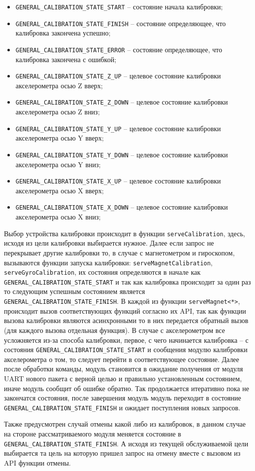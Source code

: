 \begin{itemize}
    \item \lstinline{GENERAL_CALIBRATION_STATE_START} -- состояние начала калибровки;
     \item \lstinline{GENERAL_CALIBRATION_STATE_FINISH} -- состояние определяющее, что калибровка закончена успешно;
     \item \lstinline{GENERAL_CALIBRATION_STATE_ERROR} -- состояние определяющее, что калибровка закончена с ошибкой;
     \item \lstinline{GENERAL_CALIBRATION_STATE_Z_UP} -- целевое состояние калибровки акселерометра осью Z вверх;
     \item \lstinline{GENERAL_CALIBRATION_STATE_Z_DOWN} -- целевое состояние калибровки акселерометра осью Z вниз; 
     \item \lstinline{GENERAL_CALIBRATION_STATE_Y_UP} -- целевое состояние калибровки акселерометра осью Y вверх; 
     \item \lstinline{GENERAL_CALIBRATION_STATE_Y_DOWN} -- целевое состояние калибровки акселерометра осью Y вниз; 
     \item \lstinline{GENERAL_CALIBRATION_STATE_X_UP} -- целевое состояние калибровки акселерометра осью X вверх; 
     \item \lstinline{GENERAL_CALIBRATION_STATE_X_DOWN} -- целевое состояние калибровки акселерометра осью X вниз; 
\end{itemize}

Выбор устройства калибровки происходит в функции \lstinline{serveCalibration}, здесь, исходя из цели калибровки выбирается нужное. Далее если запрос не
перекрывает другие калибровки то, в случае с магнетометром и гироскопом, вызываются функции запуска калибровки: \lstinline{serveMagnetCalibration},
\lstinline{serveGyroCalibration}, их состояния определяются в начале как \lstinline{GENERAL_CALIBRATION_STATE_START} и так как калибровка происходит за один раз
то следующим успешным состоянием является \lstinline{GENERAL_CALIBRATION_STATE_FINISH}. В каждой из функции \lstinline{serveMagnet<*>}, происходит вызов соответствующих
функций согласно их API, так как функции вызова калибровки являются асинхронными то в них передается обратный вызов (для каждого вызова отдельная функция).
В случае с акселерометром все усложняется из-за способа калибровки, первое, с чего начинается калибровка -- с состояния \lstinline{GENERAL_CALIBRATION_STATE_START} и
сообщения модулю калибровки акселерометра о том, то следует перейти в соответствующее состояние. Далее после обработки команды, модуль становится в ожидание получения
от модуля UART нового пакета с верной целью и правильно установленным состоянием, иначе модуль сообщит об ошибке обратно. Так продолжается итеративно пока не закончатся
состояния, после завершения модуль модуль переходит в состояние \lstinline{GENERAL_CALIBRATION_STATE_FINISH} и ожидает поступления новых запросов.

Также предусмотрен случай отмены какой либо из калибровок, в данном случае на стороне рассматриваемого модуля меняется состояние в \lstinline{GENERAL_CALIBRATION_STATE_FINISH}.
А исходя из текущей обслуживаемой цели выбирается та цель на которую пришел запрос на отмену вместе с вызовом из API функции отмены.

